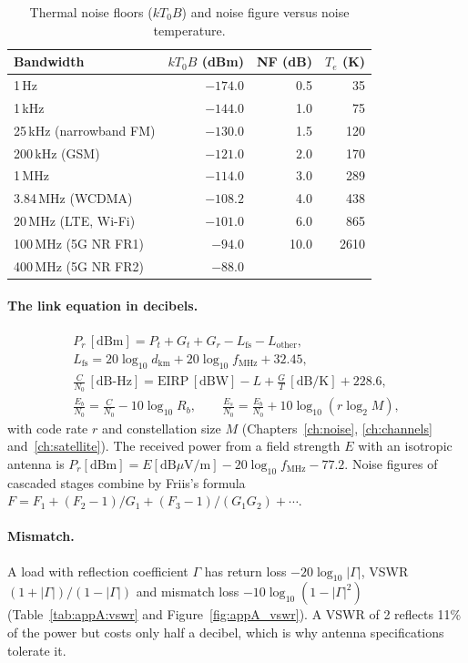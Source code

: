 \begin{table}[htbp]\centering\small
\caption{Thermal noise floors ($kT_0B$) and noise figure versus noise temperature.}\label{tab:appA:noisefloor}
\begin{tabular}{@{}lr@{\qquad\qquad}rr@{}}
\toprule
Bandwidth & $kT_0B$ (dBm) & NF (dB) & $T_e$ (K)\\
\midrule
1\,Hz & $-174.0$ & 0.5 & 35\\
1\,kHz & $-144.0$ & 1.0 & 75\\
25\,kHz (narrowband FM) & $-130.0$ & 1.5 & 120\\
200\,kHz (GSM) & $-121.0$ & 2.0 & 170\\
1\,MHz & $-114.0$ & 3.0 & 289\\
3.84\,MHz (WCDMA) & $-108.2$ & 4.0 & 438\\
20\,MHz (LTE, Wi-Fi) & $-101.0$ & 6.0 & 865\\
100\,MHz (5G NR FR1) & $-94.0$ & 10.0 & 2610\\
400\,MHz (5G NR FR2) & $-88.0$ & & \\
\bottomrule
\end{tabular}
\end{table}

\paragraph{The link equation in decibels.}
\begin{gather}
P_r\,[\mathrm{dBm}]=P_t+G_t+G_r-L_{\mathrm{fs}}-L_{\mathrm{other}},\\
L_{\mathrm{fs}}=20\log_{10}d_{\mathrm{km}}+20\log_{10}f_{\mathrm{MHz}}+32.45,\\
\frac{C}{N_0}\,[\mathrm{dB\text{-}Hz}]=\mathrm{EIRP}\,[\mathrm{dBW}]-L+\frac GT\,[\mathrm{dB/K}]+228.6,\\
\frac{E_b}{N_0}=\frac{C}{N_0}-10\log_{10}R_b,\qquad
\frac{E_s}{N_0}=\frac{E_b}{N_0}+10\log_{10}(r\log_2M),
\end{gather}
with code rate $r$ and constellation size $M$ (Chapters~\ref{ch:noise}, \ref{ch:channels}
and~\ref{ch:satellite}). The received power from a field strength $E$ with an isotropic antenna is
$P_r[\mathrm{dBm}]=E[\mathrm{dB}\mu\mathrm{V/m}]-20\log_{10}f_{\mathrm{MHz}}-77.2$. Noise figures
of cascaded stages combine by Friis's formula $F=F_1+(F_2-1)/G_1+(F_3-1)/(G_1G_2)+\cdots$.

\paragraph{Mismatch.} A load with reflection coefficient $\Gamma$ has return loss
$-20\log_{10}|\Gamma|$, VSWR $(1+|\Gamma|)/(1-|\Gamma|)$ and mismatch loss
$-10\log_{10}(1-|\Gamma|^2)$ (Table~\ref{tab:appA:vswr} and Figure~\ref{fig:appA_vswr}). A VSWR of 2
reflects 11\% of the power but costs only half a decibel, which is why antenna specifications
tolerate it.

